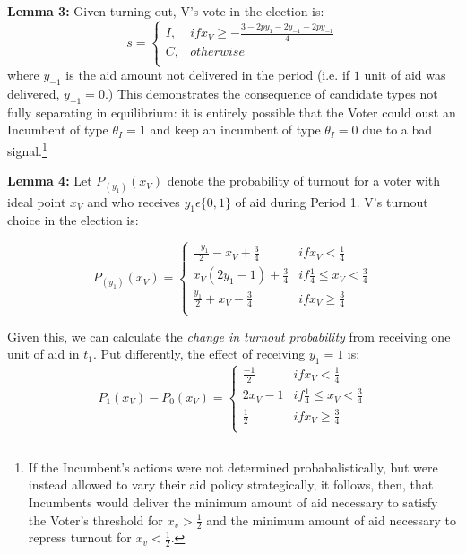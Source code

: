 \documentclass[12pt]{paper}
\begin{document}
\textbf{Lemma 3:}
Given turning out, V’s vote in the election is:
\begin{equation}
s =
\begin{cases}
I, & if x_V \geq -\frac{3 - 2py_1 - 2y_{-1} - 2py_{-1}}{4} \\    
C,     & otherwise  \\
\end{cases}
\end{equation}
where $y_{-1}$ is the aid amount not delivered in the period (i.e. if $1$ unit of aid was delivered, $y_{-1} = 0$.) This demonstrates the consequence of candidate types not fully separating in equilibrium: it is entirely possible that the Voter could oust an Incumbent of type $\theta_I = 1$ and keep an incumbent of type $\theta_I = 0$ due to a bad signal.\footnote{If the Incumbent's actions were not determined probabalistically, but were instead allowed to vary their aid policy strategically, it follows, then, that Incumbents would deliver the minimum amount of aid necessary to satisfy the Voter's threshold for $x_v > \frac{1}{2}$ and the minimum amount of aid necessary to repress turnout for $x_v < \frac{1}{2}$.}


\textbf{Lemma 4:} Let $P_(y_1 )(x_V )$ denote the probability of turnout for a voter with ideal point $x_V$ and who receives $y_1 \epsilon \{0,1\}$ of aid during Period 1. V’s turnout choice in the election is:

\begin{equation}
P_(y_1 )(x_V ) =
\begin{cases}
\frac{-y_1}{2} - x_V + \frac{3}{4} & if x_V < \frac{1}{4}\\    
x_V (2y_1 - 1) + \frac{3}{4}     & if \frac{1}{4} \leq x_V < \frac{3}{4}  \\
\frac{y_1}{2} + x_V - \frac{3}{4}     & if x_V \geq \frac{3}{4}  \\
\end{cases}
\end{equation}

Given this, we can calculate the \emph{change in turnout probability} from receiving one unit of aid in $t_1$. Put differently, the effect of receiving $y_1 = 1$ is:
\begin{equation}
P_1 (x_V ) - P_0 (x_V )=
\begin{cases}
\frac{-1}{2} & if x_V < \frac{1}{4}\\    
2x_V - 1 & if \frac{1}{4} \leq x_V < \frac{3}{4}  \\
\frac{1}{2} & if x_V \geq \frac{3}{4}  \\
\end{cases}
\end{equation}
\end{document}
